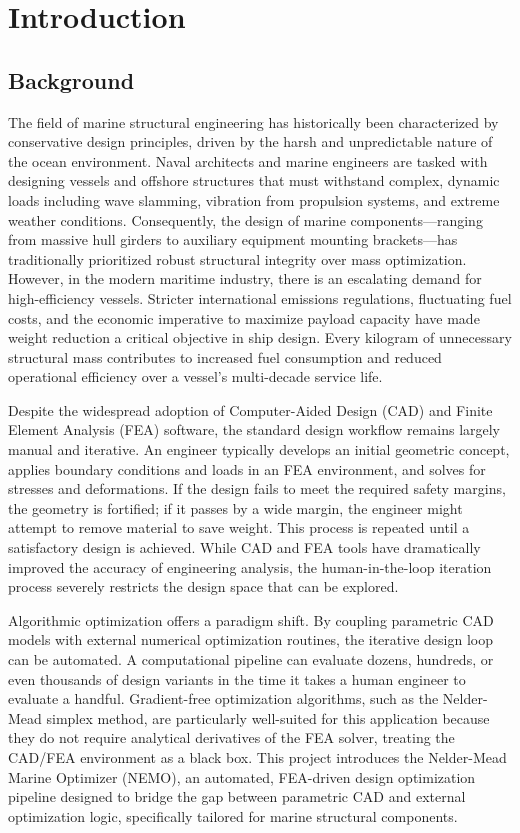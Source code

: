 \chapter{Introduction}

\section{Background}
The field of marine structural engineering has historically been characterized by conservative design principles, driven by the harsh and unpredictable nature of the ocean environment. Naval architects and marine engineers are tasked with designing vessels and offshore structures that must withstand complex, dynamic loads including wave slamming, vibration from propulsion systems, and extreme weather conditions. Consequently, the design of marine components---ranging from massive hull girders to auxiliary equipment mounting brackets---has traditionally prioritized robust structural integrity over mass optimization. However, in the modern maritime industry, there is an escalating demand for high-efficiency vessels. Stricter international emissions regulations, fluctuating fuel costs, and the economic imperative to maximize payload capacity have made weight reduction a critical objective in ship design. Every kilogram of unnecessary structural mass contributes to increased fuel consumption and reduced operational efficiency over a vessel's multi-decade service life.

Despite the widespread adoption of Computer-Aided Design (CAD) and Finite Element Analysis (FEA) software, the standard design workflow remains largely manual and iterative. An engineer typically develops an initial geometric concept, applies boundary conditions and loads in an FEA environment, and solves for stresses and deformations. If the design fails to meet the required safety margins, the geometry is fortified; if it passes by a wide margin, the engineer might attempt to remove material to save weight. This process is repeated until a satisfactory design is achieved. While CAD and FEA tools have dramatically improved the accuracy of engineering analysis, the human-in-the-loop iteration process severely restricts the design space that can be explored. 

Algorithmic optimization offers a paradigm shift. By coupling parametric CAD models with external numerical optimization routines, the iterative design loop can be automated. A computational pipeline can evaluate dozens, hundreds, or even thousands of design variants in the time it takes a human engineer to evaluate a handful. Gradient-free optimization algorithms, such as the Nelder-Mead simplex method, are particularly well-suited for this application because they do not require analytical derivatives of the FEA solver, treating the CAD/FEA environment as a black box. This project introduces the Nelder-Mead Marine Optimizer (NEMO), an automated, FEA-driven design optimization pipeline designed to bridge the gap between parametric CAD and external optimization logic, specifically tailored for marine structural components.

